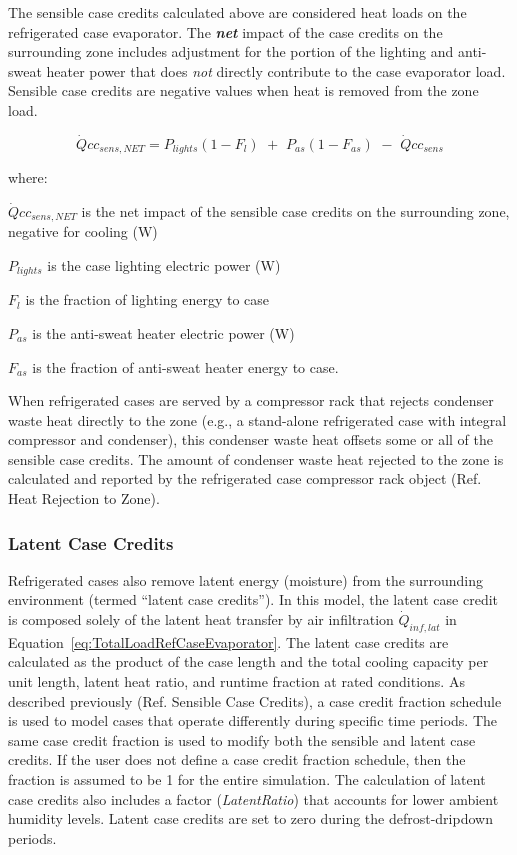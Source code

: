 The sensible case credits calculated above are considered heat loads on the refrigerated case evaporator. The \textbf{\emph{net}} impact of the case credits on the surrounding zone includes adjustment for the portion of the lighting and anti-sweat heater power that does \emph{not} directly contribute to the case evaporator load. Sensible case credits are negative values when heat is removed from the zone load.

\begin{equation}
\dot Qc{c_{sens,NET}} = {P_{lights}}(1 - {F_l})\,\, + \,\,{P_{as}}(1 - {F_{as}})\,\, - \,\,\dot Qc{c_{sens}}
\end{equation}

where:

\(\dot Qc{c_{sens,NET}}\) is the net impact of the sensible case credits on the surrounding zone, negative for cooling (W)

\({P_{lights}}\) is the case lighting electric power (W)

\({F_l}\) is the fraction of lighting energy to case

\({P_{as}}\) is the anti-sweat heater electric power (W)

\({F_{as}}\) is the fraction of anti-sweat heater energy to case.

When refrigerated cases are served by a compressor rack that rejects condenser waste heat directly to the zone (e.g., a stand-alone refrigerated case with integral compressor and condenser), this condenser waste heat offsets some or all of the sensible case credits. The amount of condenser waste heat rejected to the zone is calculated and reported by the refrigerated case compressor rack object (Ref. Heat Rejection to Zone).

\subsubsection{Latent Case Credits}\label{latent-case-credits}

Refrigerated cases also remove latent energy (moisture) from the surrounding environment (termed ``latent case credits''). In this model, the latent case credit is composed solely of the latent heat transfer by air infiltration \({\dot Q_{inf,lat}}\) in Equation~\ref{eq:TotalLoadRefCaseEvaporator}. The latent case credits are calculated as the product of the case length and the total cooling capacity per unit length, latent heat ratio, and runtime fraction at rated conditions. As described previously (Ref. Sensible Case Credits), a case credit fraction schedule is used to model cases that operate differently during specific time periods. The same case credit fraction is used to modify both the sensible and latent case credits. If the user does not define a case credit fraction schedule, then the fraction is assumed to be 1 for the entire simulation. The calculation of latent case credits also includes a factor (\emph{LatentRatio}) that accounts for lower ambient humidity levels. Latent case credits are set to zero during the defrost-dripdown periods.

